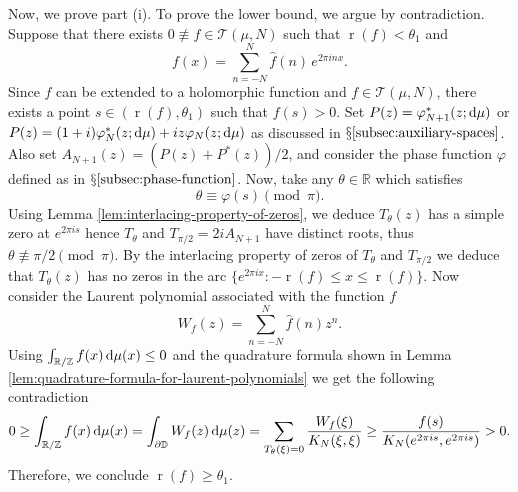 \documentclass[reqno, a4paper]{amsart}
\def\R{\mathbb{R}}
\def\T{\mathbb{R}/\mathbb{Z}}
\renewcommand{\d}{\text{\rm d}}
\newcommand{\dD}{\partial\mathbb{D}}
\renewcommand{\r}{\operatorname{r}}
\theoremstyle{plain}
\theoremstyle{definition}
\theoremstyle{remarkstyle}
\numberwithin{equation}{section}
\begin{document}
\smallskip

Now, we prove part (i). To prove the lower bound, we argue by contradiction. Suppose that there exists $0\not\equiv f\in \mathcal{T}(\mu, N)$ such that $\r(f)<\theta_1$ and 
\begin{equation*}
   f(x)=\sum_{n=-N}^N \widehat{f}(n) \, e^{2\pi i n x}.
\end{equation*}
Since $f$ can be extended to a holomorphic function and $f\in \mathcal{T}(\mu, N)$, there exists a point $s\in (\r(f), \theta_1)$ such that $f(s)>0$. 
Set $P(z)=\varphi_{N+1}^\ast(z; \d\mu)$ or $P(z)=(1+i)\varphi_{N}^*(z;\d\mu) + i z \varphi_{N}(z;\d\mu)$ as discussed in $\mathsection \ref{subsec:auxiliary-spaces}$. Also set $A_{N+1}(z)=(P(z)+P^\ast(z))/2$, and  consider the phase function $\varphi$ defined as in $\mathsection\ref{subsec:phase-function}$. Now, take any $\theta\in \R$ which satisfies
\begin{equation*}
   \theta \equiv \varphi(s)\pmod{\pi}.
\end{equation*}
Using Lemma \ref{lem:interlacing-property-of-zeros}, we deduce
$T_\theta(z)$ has a simple zero at $e^{2\pi i s}$ hence $T_\theta$ and $T_{\pi/2}=2 i A_{N+1}$ have distinct roots, thus $\theta \not\equiv \pi/2 \pmod{\pi}$. By the interlacing property of zeros of $T_\theta$ and $T_{\pi/2}$ we deduce that $T_\theta(z)$ has no zeros in the arc $\{e^{2\pi i x} : -\r(f)\leq x\leq \r(f)\}$. Now consider the  Laurent polynomial associated with the function $f$
\begin{equation*}
   W_f(z)=\sum_{n=-N}^N \widehat{f}(n) z^n.
\end{equation*}
Using $\int_{\T} f(x)\,\d\mu(x)\leq 0$ and the quadrature formula shown in Lemma \ref{lem:quadrature-formula-for-laurent-polynomials} we get the following contradiction
\begin{equation*}
   0\geq \int_{\T}f(x)\, \d\mu(x)=\int_{\dD} W_f(z)\, \d\mu(z)=\sum_{T_\theta(\xi)=0} \frac{W_f(\xi)}{K_{N}(\xi, \xi)}\geq\frac{f(s)}{K_N(e^{2\pi i s}, e^{2\pi i s})}> 0.
\end{equation*}
Therefore, we conclude $\r(f)\geq \theta_1$.

\smallskip
\end{document}
